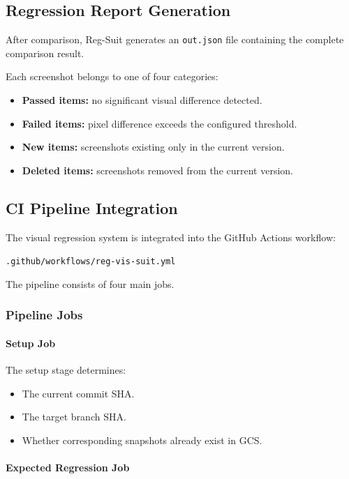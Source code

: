 \subsection{Regression Report Generation}

After comparison, Reg-Suit generates an \texttt{out.json} file containing the complete comparison result.

Each screenshot belongs to one of four categories:

\begin{itemize}
    \item \textbf{Passed items:} no significant visual difference detected.
    \item \textbf{Failed items:} pixel difference exceeds the configured threshold.
    \item \textbf{New items:} screenshots existing only in the current version.
    \item \textbf{Deleted items:} screenshots removed from the current version.
\end{itemize}


\subsection{CI Pipeline Integration}

The visual regression system is integrated into the GitHub Actions workflow:

\texttt{.github/workflows/reg-vis-suit.yml}

The pipeline consists of four main jobs.

\subsubsection{Pipeline Jobs}

\paragraph{Setup Job}

The setup stage determines:

\begin{itemize}
    \item The current commit SHA.
    \item The target branch SHA.
    \item Whether corresponding snapshots already exist in GCS.
\end{itemize}


\paragraph{Expected Regression Job}

